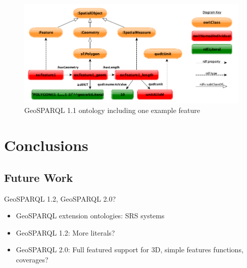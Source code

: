 \documentclass[runningheads]{llncs}
\begin{document}
\begin{figure}[htb]
    \centering
    \includegraphics[width=\linewidth]{images/geold_ontology.png}
    \caption{GeoSPARQL 1.1 ontology including one example feature}
    \label{fig:geosparql11ontology}
\end{figure}

\section{Conclusions}\label{sec:conclusions}

\subsection{Future Work}\label{sec:futurework}
GeoSPARQL 1.2, GeoSPARQL 2.0?
\begin{itemize}
    \item GeoSPARQL extension ontologies: SRS systems
    \item GeoSPARQL 1.2: More literals?
    \item GeoSPARQL 2.0: Full featured support for 3D, simple features functions, coverages?
\end{itemize}


%
%
%


%
\end{document}

